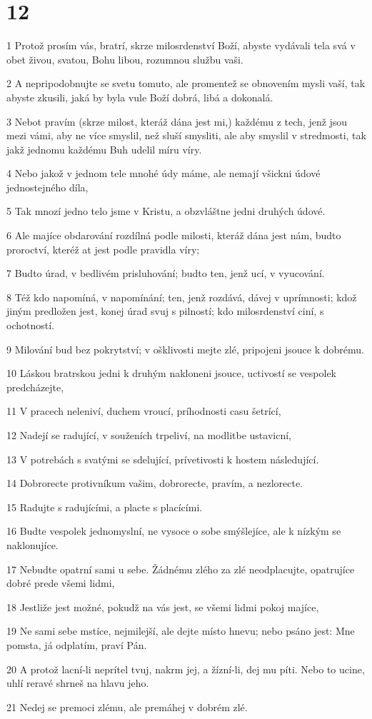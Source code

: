 \chapter{12}

\par 1 Protož prosím vás, bratrí, skrze milosrdenství Boží, abyste vydávali tela svá v obet živou, svatou, Bohu libou, rozumnou službu vaši.
\par 2 A nepripodobnujte se svetu tomuto, ale promentež se obnovením mysli vaší, tak abyste zkusili, jaká by byla vule Boží dobrá, libá a dokonalá.
\par 3 Nebot pravím (skrze milost, kteráž dána jest mi,) každému z tech, jenž jsou mezi vámi, aby ne více smyslil, než sluší smysliti, ale aby smyslil v stredmosti, tak jakž jednomu každému Buh udelil míru víry.
\par 4 Nebo jakož v jednom tele mnohé údy máme, ale nemají všickni údové jednostejného díla,
\par 5 Tak mnozí jedno telo jsme v Kristu, a obzvláštne jedni druhých údové.
\par 6 Ale majíce obdarování rozdílná podle milosti, kteráž dána jest nám, budto proroctví, kteréž at jest podle pravidla víry;
\par 7 Budto úrad, v bedlivém prisluhování; budto ten, jenž ucí, v vyucování.
\par 8 Též kdo napomíná, v napomínání; ten, jenž rozdává, dávej v uprímnosti; kdož jiným predložen jest, konej úrad svuj s pilností; kdo milosrdenství ciní, s ochotností.
\par 9 Milování bud bez pokrytství; v ošklivosti mejte zlé, pripojeni jsouce k dobrému.
\par 10 Láskou bratrskou jedni k druhým nakloneni jsouce, uctivostí se vespolek predcházejte,
\par 11 V pracech neleniví, duchem vroucí, príhodnosti casu šetrící,
\par 12 Nadejí se radující, v souženích trpeliví, na modlitbe ustavicní,
\par 13 V potrebách s svatými se sdelující, prívetivosti k hostem následující.
\par 14 Dobrorecte protivníkum vašim, dobrorecte, pravím, a nezlorecte.
\par 15 Radujte s radujícími, a placte s placícími.
\par 16 Budte vespolek jednomyslní, ne vysoce o sobe smýšlejíce, ale k nízkým se naklonujíce.
\par 17 Nebudte opatrní sami u sebe. Žádnému zlého za zlé neodplacujte, opatrujíce dobré prede všemi lidmi,
\par 18 Jestliže jest možné, pokudž na vás jest, se všemi lidmi pokoj majíce,
\par 19 Ne sami sebe mstíce, nejmilejší, ale dejte místo hnevu; nebo psáno jest: Mne pomsta, já odplatím, praví Pán.
\par 20 A protož lacní-li neprítel tvuj, nakrm jej, a žízní-li, dej mu píti. Nebo to ucine, uhlí reravé shrneš na hlavu jeho.
\par 21 Nedej se premoci zlému, ale premáhej v dobrém zlé.

